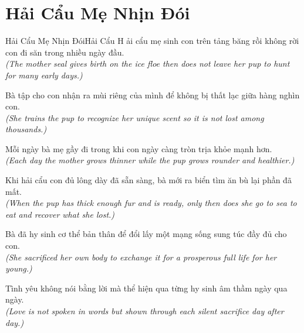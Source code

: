 \section{Hải Cẩu Mẹ Nhịn Đói}
\begin{truyen}{Hải Cẩu Mẹ Nhịn Đói}{Hải Cẩu}
H ải cẩu mẹ sinh con trên tảng băng rồi không rời con đi săn trong nhiều ngày đầu.\\
\textit{(The mother seal gives birth on the ice floe then does not leave her pup to hunt for many early days.)}

Bà tập cho con nhận ra mùi riêng của mình để không bị thất lạc giữa hàng nghìn con.\\
\textit{(She trains the pup to recognize her unique scent so it is not lost among thousands.)}

Mỗi ngày bà mẹ gầy đi trong khi con ngày càng tròn trịa khỏe mạnh hơn.\\
\textit{(Each day the mother grows thinner while the pup grows rounder and healthier.)}

Khi hải cẩu con đủ lông dày đã sẵn sàng, bà mới ra biển tìm ăn bù lại phần đã mất.\\
\textit{(When the pup has thick enough fur and is ready, only then does she go to sea to eat and recover what she lost.)}

Bà đã hy sinh cơ thể bản thân để đổi lấy một mạng sống sung túc đầy đủ cho con.\\
\textit{(She sacrificed her own body to exchange it for a prosperous full life for her young.)}

\end{truyen}
\begin{baihoc}
  Tình yêu không nói bằng lời mà thể hiện qua từng hy sinh âm thầm ngày qua ngày.\\
  \textit{(Love is not spoken in words but shown through each silent sacrifice day after day.)}
\end{baihoc}

